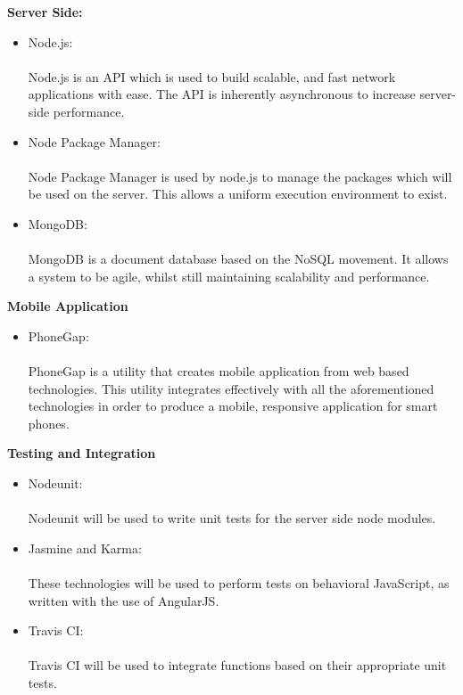{\bfseries Server Side:}
\begin{itemize}
	\item Node.js:\\ \\ 
	Node.js is an API which is used to build scalable, and fast network applications with ease. The API is inherently asynchronous to increase server-side performance.
	\item Node Package Manager:\\ \\
	Node Package Manager is used by node.js to manage the packages which will be used on the server. This allows a uniform execution environment to exist.
	\item MongoDB: \\ \\
	MongoDB is a document database based on the NoSQL movement. It allows a system to be agile, whilst still maintaining scalability and performance.
\end{itemize}
{\bfseries Mobile Application}
\begin{itemize}
	\item PhoneGap:\\ \\
	PhoneGap is a utility that creates mobile application from web based technologies. This utility integrates effectively with all the aforementioned technologies in order to produce a mobile, responsive application for smart phones.
\end{itemize}
{\bfseries Testing and Integration}
\begin{itemize}
	\item Nodeunit:\\ \\
	Nodeunit will be used to write unit tests for the server side node modules.
	\item Jasmine and Karma:\\ \\
	These technologies will be used to perform tests on behavioral JavaScript, as written with the use of AngularJS.
	\item Travis CI:\\ \\
	Travis CI will be used to integrate functions based on their appropriate unit tests.
\end{itemize}